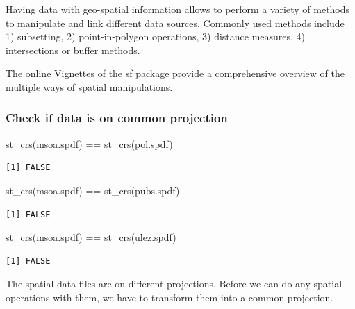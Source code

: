 \documentclass[
  letterpaper,
  DIV=11,
  numbers=noendperiod]{scrreprt}
\newenvironment{Shaded}{\begin{snugshade}}{\end{snugshade}}
\newcommand{\FunctionTok}[1]{\textcolor[rgb]{0.28,0.35,0.67}{#1}}
\newcommand{\NormalTok}[1]{\textcolor[rgb]{0.00,0.23,0.31}{#1}}
\newcommand{\SpecialCharTok}[1]{\textcolor[rgb]{0.37,0.37,0.37}{#1}}
\begin{document}
Having data with geo-spatial information allows to perform a variety of
methods to manipulate and link different data sources. Commonly used
methods include 1) subsetting, 2) point-in-polygon operations, 3)
distance measures, 4) intersections or buffer methods.

The \href{https://r-spatial.github.io/sf/articles/}{online Vignettes of
the sf package} provide a comprehensive overview of the multiple ways of
spatial manipulations.

\hypertarget{check-if-data-is-on-common-projection}{%
\subsubsection{Check if data is on common
projection}\label{check-if-data-is-on-common-projection}}

\begin{Shaded}
\begin{Highlighting}[]
\FunctionTok{st\_crs}\NormalTok{(msoa.spdf) }\SpecialCharTok{==} \FunctionTok{st\_crs}\NormalTok{(pol.spdf)}
\end{Highlighting}
\end{Shaded}

\begin{verbatim}
[1] FALSE
\end{verbatim}

\begin{Shaded}
\begin{Highlighting}[]
\FunctionTok{st\_crs}\NormalTok{(msoa.spdf) }\SpecialCharTok{==} \FunctionTok{st\_crs}\NormalTok{(pubs.spdf)}
\end{Highlighting}
\end{Shaded}

\begin{verbatim}
[1] FALSE
\end{verbatim}

\begin{Shaded}
\begin{Highlighting}[]
\FunctionTok{st\_crs}\NormalTok{(msoa.spdf) }\SpecialCharTok{==} \FunctionTok{st\_crs}\NormalTok{(ulez.spdf)}
\end{Highlighting}
\end{Shaded}

\begin{verbatim}
[1] FALSE
\end{verbatim}

The spatial data files are on different projections. Before we can do
any spatial operations with them, we have to transform them into a
common projection.
\end{document}
